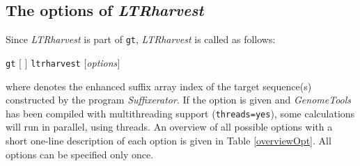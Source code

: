 \documentclass[12pt,titlepage]{article}
\newcommand{\LTRharvest}{\textit{LTRharvest}\xspace}
\newcommand{\GenomeTools}{\textit{GenomeTools}\xspace}
\newcommand{\Suffixerator}{\textit{Suffixerator}\xspace}
\newcommand{\Gt}{\texttt{gt}\xspace}
\begin{document}
\subsection{The options of \LTRharvest} \label{Overview}

Since \LTRharvest is part of \Gt, \LTRharvest is called as follows:

\texttt{gt} $[$  $]$ \texttt{ltrharvest}   $[$\emph{options}$]$

where  denotes the enhanced suffix array index of the
target sequence(s) constructed by the program \Suffixerator. If the option
 is given and \GenomeTools has been compiled with multithreading
support (\texttt{threads=yes}), some calculations will run in parallel, using
 threads.
An overview of all possible options with a short one-line description of each
option is given in Table \ref{overviewOpt}. All options can be specified only
once.
\end{document}
